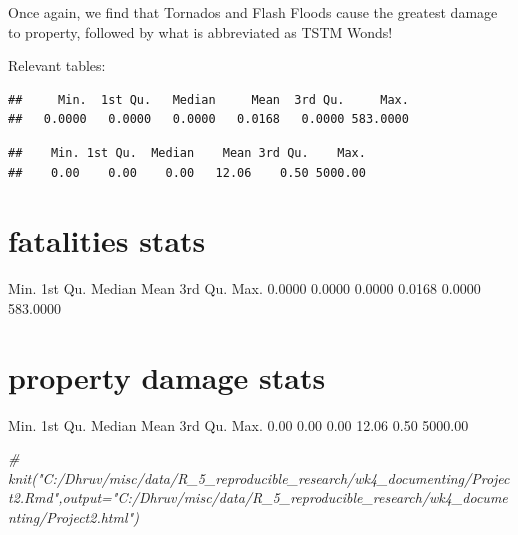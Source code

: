 \documentclass[]{article}
\newenvironment{Shaded}{\begin{snugshade}}{\end{snugshade}}
\newcommand{\KeywordTok}[1]{\textcolor[rgb]{0.13,0.29,0.53}{\textbf{#1}}}
\newcommand{\CommentTok}[1]{\textcolor[rgb]{0.56,0.35,0.01}{\textit{#1}}}
\newcommand{\OperatorTok}[1]{\textcolor[rgb]{0.81,0.36,0.00}{\textbf{#1}}}
\newcommand{\NormalTok}[1]{#1}
\begin{document}
Once again, we find that Tornados and Flash Floods cause the greatest
damage to property, followed by what is abbreviated as TSTM Wonds!

Relevant tables:

\begin{Shaded}
\end{Shaded}

\begin{verbatim}
##     Min.  1st Qu.   Median     Mean  3rd Qu.     Max. 
##   0.0000   0.0000   0.0000   0.0168   0.0000 583.0000
\end{verbatim}

\begin{Shaded}
\end{Shaded}

\begin{verbatim}
##    Min. 1st Qu.  Median    Mean 3rd Qu.    Max. 
##    0.00    0.00    0.00   12.06    0.50 5000.00
\end{verbatim}

\section{fatalities stats}\label{fatalities-stats}

Min. 1st Qu. Median Mean 3rd Qu. Max. 0.0000 0.0000 0.0000 0.0168 0.0000
583.0000

\section{property damage stats}\label{property-damage-stats}

Min. 1st Qu. Median Mean 3rd Qu. Max. 0.00 0.00 0.00 12.06 0.50 5000.00

\begin{Shaded}
\begin{Highlighting}[]
\CommentTok{# knit("C:/Dhruv/misc/data/R_5_reproducible_research/wk4_documenting/Project2.Rmd",output="C:/Dhruv/misc/data/R_5_reproducible_research/wk4_documenting/Project2.html")}
\end{Highlighting}
\end{Shaded}
\end{document}
